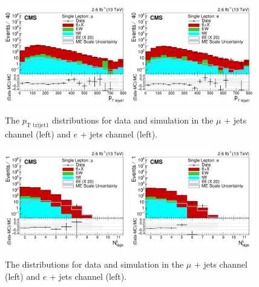     
\begin{figure}[ht!]
    \includegraphics[width=0.48\textwidth]{images/Run2/bestTopPt_StackLogY.pdf}
    \includegraphics[width=0.48\textwidth]{images/Run2/bestTopPt_StackLogY_e.pdf}
    \caption{The $p_{\textrm{T trijet1}}$ distributions for data and simulation in the $\mu$ + jets channel (left) and $e$ + jets channel (left).}
    \label{fig:bestTopPt}
\end{figure}
   

\begin{figure}[ht!]
    \includegraphics[width=0.48\textwidth]{images/Run2/nLtags_StackLogY.pdf}
    \includegraphics[width=0.48\textwidth]{images/Run2/nLtags_StackLogY_e.pdf}
    \caption{The \nLtags distributions for data and simulation in the $\mu$ + jets channel (left) and $e$ + jets channel (left).}
    \label{fig:nLtagsInc}
\end{figure}

